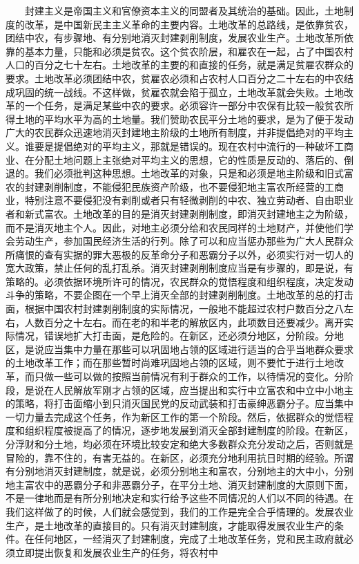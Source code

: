 \documentclass[cn,11pt,chinese]{elegantbook}
\begin{document}
　　封建主义是帝国主义和官僚资本主义的同盟者及其统治的基础。因此，土地制度的改革，是中国新民主主义革命的主要内容。土地改革的总路线，是依靠贫农，团结中农，有步骤地、有分别地消灭封建剥削制度，发展农业生产。土地改革所依靠的基本力量，只能和必须是贫农。这个贫农阶层，和雇农在一起，占了中国农村人口的百分之七十左右。土地改革的主要的和直接的任务，就是满足贫雇农群众的要求。土地改革必须团结中农，贫雇农必须和占农村人口百分之二十左右的中农结成巩固的统一战线。不这样做，贫雇农就会陷于孤立，土地改革就会失败。土地改革的一个任务，是满足某些中农的要求。必须容许一部分中农保有比较一般贫农所得土地的平均水平为高的土地量。我们赞助农民平分土地的要求，是为了便于发动广大的农民群众迅速地消灭封建地主阶级的土地所有制度，并非提倡绝对的平均主义。谁要是提倡绝对的平均主义，那就是错误的。现在农村中流行的一种破坏工商业、在分配土地问题上主张绝对平均主义的思想，它的性质是反动的、落后的、倒退的。我们必须批判这种思想。土地改革的对象，只是和必须是地主阶级和旧式富农的封建剥削制度，不能侵犯民族资产阶级，也不要侵犯地主富农所经营的工商业，特别注意不要侵犯没有剥削或者只有轻微剥削的中农、独立劳动者、自由职业者和新式富农。土地改革的目的是消灭封建剥削制度，即消灭封建地主之为阶级，而不是消灭地主个人。因此，对地主必须分给和农民同样的土地财产，并使他们学会劳动生产，参加国民经济生活的行列。除了可以和应当惩办那些为广大人民群众所痛恨的查有实据的罪大恶极的反革命分子和恶霸分子以外，必须实行对一切人的宽大政策，禁止任何的乱打乱杀。消灭封建剥削制度应当是有步骤的，即是说，有策略的。必须依据环境所许可的情况，农民群众的觉悟程度和组织程度，决定发动斗争的策略，不要企图在一个早上消灭全部的封建剥削制度。土地改革的总的打击面，根据中国农村封建剥削制度的实际情况，一般地不能超过农村户数百分之八左右，人数百分之十左右。而在老的和半老的解放区内，此项数目还要减少。离开实际情况，错误地扩大打击面，是危险的。在新区，还必须分地区，分阶段。分地区，是说应当集中力量在那些可以巩固地占领的区域进行适当的合乎当地群众要求的土地改革工作；而在那些暂时尚难巩固地占领的区域，则不要忙于进行土地改革，而只做一些可以做的按照当前情况有利于群众的工作，以待情况的变化。分阶段，是说在人民解放军刚才占领的区域，应当提出和实行中立富农和中立中小地主的策略，将打击面缩小到只消灭国民党的反动武装和打击豪绅恶霸分子。应当集中一切力量去完成这个任务，作为新区工作的第一个阶段。然后，依据群众的觉悟程度和组织程度被提高了的情况，逐步地发展到消灭全部封建制度的阶段。在新区，分浮财和分土地，均必须在环境比较安定和绝大多数群众充分发动之后，否则就是冒险的，靠不住的，有害无益的。在新区，必须充分地利用抗日时期的经验。所谓有分别地消灭封建制度，就是说，必须分别地主和富农，分别地主的大中小，分别地主富农中的恶霸分子和非恶霸分子，在平分土地、消灭封建制度的大原则下面，不是一律地而是有所分别地决定和实行给予这些不同情况的人们以不同的待遇。在我们这样做了的时候，人们就会感觉到，我们的工作是完全合乎情理的。发展农业生产，是土地改革的直接目的。只有消灭封建制度，才能取得发展农业生产的条件。在任何地区，一经消灭了封建制度，完成了土地改革任务，党和民主政府就必须立即提出恢复和发展农业生产的任务，将农村中
\end{document}
